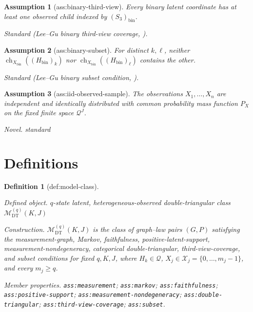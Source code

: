 \documentclass{article}
\newtheorem{assumption}{Assumption}
\newtheorem{definition}{Definition}
\begin{document}
\begin{assumption}[ass:binary-third-view]\label{ass:binary-third-view}
Every binary latent coordinate has at least one observed child indexed by \((S_3)_{\mathrm{bin}}\).
\par\smallskip\noindent\emph{Standard} (Lee--Gu binary third-view coverage, \cite{LeeGu2026DTBLCM}).
\end{assumption}

\begin{assumption}[ass:binary-subset]\label{ass:binary-subset}
For distinct \(k,\ell\), neither \(\operatorname{ch}_{X_{\mathrm{bin}}}((H_{\mathrm{bin}})_k)\) nor \(\operatorname{ch}_{X_{\mathrm{bin}}}((H_{\mathrm{bin}})_\ell)\) contains the other.
\par\smallskip\noindent\emph{Standard} (Lee--Gu binary subset condition, \cite{LeeGu2026DTBLCM}).
\end{assumption}

\begin{assumption}[ass:iid-observed-sample]\label{ass:iid-observed-sample}
The observations \(X_1,\ldots,X_n\) are independent and identically distributed with common probability mass function \(P_X\) on the fixed finite space \(\mathcal Q^J\).
\par\smallskip\noindent\emph{Novel.} standard
\end{assumption}

\section{Definitions}

\begin{definition}[def:model-class]\label{def:model-class}
\par\smallskip\noindent\emph{Defined object.} \(q\)-state latent, heterogeneous-observed double-triangular class \(\mathcal M_{\mathrm{DT}}^{(q)}(K,J)\)
\par\smallskip\noindent\emph{Construction.} \(\mathcal M_{\mathrm{DT}}^{(q)}(K,J)\) is the class of graph--law pairs \((G,P)\) satisfying the measurement-graph, Markov, faithfulness, positive-latent-support, measurement-nondegeneracy, categorical double-triangular, third-view-coverage, and subset conditions for fixed \(q,K,J\), where \(H_k\in\mathcal Q\), \(X_j\in\mathcal X_j=\{0,\ldots,m_j-1\}\), and every \(m_j\ge q\).
\par\smallskip\noindent\emph{Member properties.} \texttt{ass:\allowbreak{}measurement}; \texttt{ass:\allowbreak{}markov}; \texttt{ass:\allowbreak{}faithfulness}; \texttt{ass:\allowbreak{}positive-\allowbreak{}support}; \texttt{ass:\allowbreak{}measurement-\allowbreak{}nondegeneracy}; \texttt{ass:\allowbreak{}double-\allowbreak{}triangular}; \texttt{ass:\allowbreak{}third-\allowbreak{}view-\allowbreak{}coverage}; \texttt{ass:\allowbreak{}subset}.
\end{definition}
\end{document}
